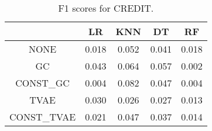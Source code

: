 \begin{table}
\caption{F1 scores for CREDIT.}
\label{tab:f1-CREDIT}
\begin{tabular}{ccccc}
\toprule
 & LR & KNN & DT & RF \\
\midrule
NONE & 0.018 & 0.052 & 0.041 & 0.018 \\
GC & 0.043 & 0.064 & 0.057 & 0.002 \\
CONST\_GC & 0.004 & 0.082 & 0.047 & 0.004 \\
TVAE & 0.030 & 0.026 & 0.027 & 0.013 \\
CONST\_TVAE & 0.021 & 0.047 & 0.037 & 0.014 \\
\bottomrule
\end{tabular}
\end{table}
